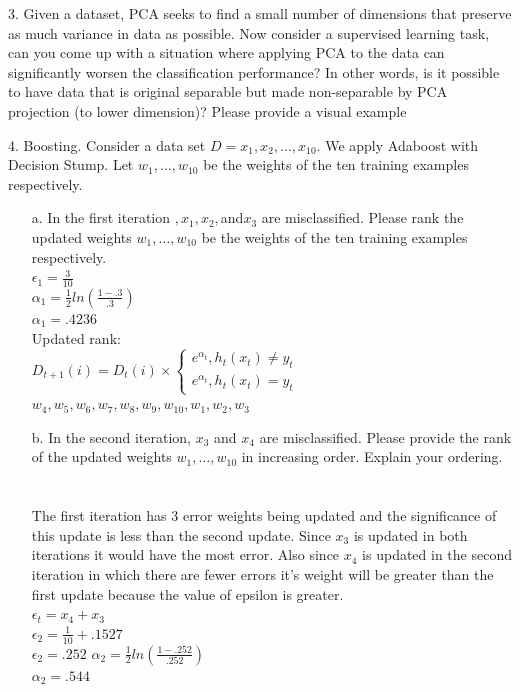 \documentclass[12pt,letterpaper]{article}
\begin{document}
	\pagebreak
	\item[3.] Given a dataset, PCA seeks to find a small number of dimensions that preserve as much variance in data as possible. Now consider a supervised learning task, can you come up with a situation where applying PCA to the data can significantly worsen the classification performance? In other words, is it possible to have data that is original separable but made non-separable by PCA projection (to lower dimension)? Please provide a visual example \\
\pagebreak	
	\item[4.] Boosting. Consider a data set $D = {x_{1},x_{2},\ldots,x_{10}}$. We apply Adaboost with Decision Stump. Let $w_{1}, \ldots, w_{10}$ be the weights of the ten training examples respectively. \\
	\begin{enumerate}
		\item[a.] In the first iteration $, x_{1}, x_{2},$and$ x_{3}$ are misclassified. Please rank the updated weights $w_{1}, \ldots, w_{10}$ be the weights of the ten training examples respectively. \\
		$\epsilon_{1} = \frac{3}{10}$ \\
		$\alpha_{1} = \frac{1}{2} ln (\frac{1 - .3}{.3})$ \\
		$\alpha_{1} = .4236$ \\
		
		Updated rank: \\ 
			
		$D_{t+1}(i) = D_{t}(i) \times \begin{cases} e^{\alpha_{t}}, h_{t}(x_{t}) \neq y_{t} \\ e^{\alpha_{t}}, h_{t}(x_{t}) = y_{t} \end{cases}$ \\[10mm]
		

		$w_{4}, w_{5}, w_{6}, w_{7}, w_{8}, w_{9}, w_{10}, w_{1}, w_{2}, w_{3}$ \\
			
		\item[b.] In the second iteration, $x_{3}$ and $x_{4}$ are misclassified. Please provide the rank of the updated weights $w_{1}, \ldots, w_{10}$ in increasing order. Explain your ordering. \\
		\\
        \\
        The first iteration has 3 error weights being updated and the significance of this update is less than the second update.  Since $x_{3}$ is updated in both iterations it would have the most error.  Also since $x_{4}$ is updated in the second iteration in which there are fewer errors it's weight will be greater than the first update because the value of epsilon is greater. \\
		$\epsilon_{t} = x_{4} + x_{3} $ \\
		$\epsilon_{2} = \frac{1}{10} + .1527 $ \\
		$\epsilon_{2} = .252$ 
		$\alpha_{2} = \frac{1}{2} ln (\frac{1 - .252}{.252})$ \\
		$\alpha_{2} = .544$ \\
		

\end{enumerate}
\end{document}

